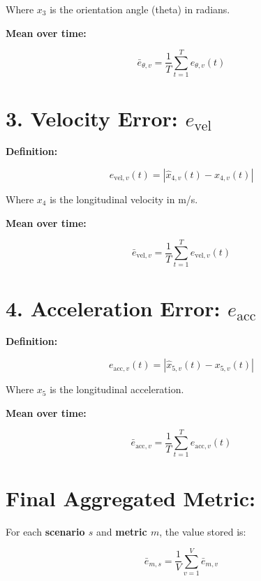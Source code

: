 \documentclass{article}
\begin{document}
Where $x_3$ is the orientation angle (theta) in radians.

\textbf{Mean over time:}

\begin{equation}
    \bar{e}_{\theta,v} = \frac{1}{T} \sum_{t=1}^{T} e_{\theta,v}(t)
\end{equation}

\section*{ 3. \textbf{Velocity Error}: $e_{\text{vel}}$}

\textbf{Definition:}

\begin{equation}
    e_{\text{vel},v}(t) = \left| \hat{x}_{4,v}(t) - x_{4,v}(t) \right|
\end{equation}

Where $x_4$ is the longitudinal velocity in m/s.

\textbf{Mean over time:}

\begin{equation}
    \bar{e}_{\text{vel},v} = \frac{1}{T} \sum_{t=1}^{T} e_{\text{vel},v}(t)
\end{equation}

\section*{4. \textbf{Acceleration Error}: $e_{\text{acc}}$}

\textbf{Definition:}

\begin{equation}
    e_{\text{acc},v}(t) = \left| \hat{x}_{5,v}(t) - x_{5,v}(t) \right|
\end{equation}

Where $x_5$ is the longitudinal acceleration.

\textbf{Mean over time:}

\begin{equation}
    \bar{e}_{\text{acc},v} = \frac{1}{T} \sum_{t=1}^{T} e_{\text{acc},v}(t)
\end{equation}

\section*{ Final Aggregated Metric:}

For each \textbf{scenario $s$} and \textbf{metric $m$}, the value stored is:

\begin{equation}
    \bar{e}_{m,s} = \frac{1}{V} \sum_{v=1}^{V} \bar{e}_{m,v}
\end{equation}
\end{document}
